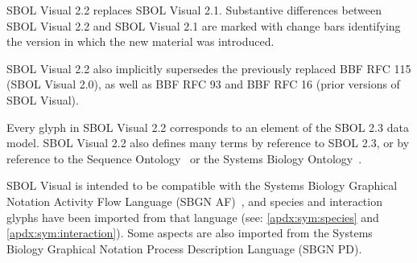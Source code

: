 
SBOL Visual 2.2 replaces SBOL Visual 2.1.
%
Substantive differences between SBOL Visual 2.2 and SBOL Visual 2.1 are marked with change bars identifying the version in which the new material was introduced.

SBOL Visual 2.2 also implicitly supersedes the previously replaced BBF RFC 115 (SBOL Visual 2.0), as well as BBF RFC 93 and BBF RFC 16 (prior versions of SBOL Visual).

Every glyph in SBOL Visual 2.2 corresponds to an element of the SBOL 2.3 data model.
SBOL Visual 2.2 also defines many terms by reference to SBOL 2.3, 
or by reference to the Sequence Ontology~\citep{SequenceOntology}
or the Systems Biology Ontology~\citep{SBO}.

SBOL Visual is intended to be compatible with the Systems Biology Graphical Notation Activity Flow Language (SBGN AF)~\citep{sbgn}, 
and species and interaction glyphs have been imported from that language (see: \ref{apdx:sym:species} and \ref{apdx:sym:interaction}).
Some aspects are also imported from the Systems Biology Graphical Notation Process Description Language (SBGN PD).
